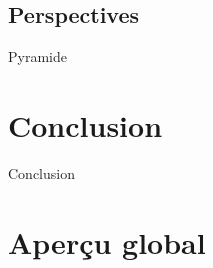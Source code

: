 \documentclass{bredelebeamer}
\begin{document}
\subsection{Perspectives}


\begin{frame}{Pyramide}
\end{frame}




\section{Conclusion}


\begin{frame}{Conclusion}
\end{frame}




\section{Aperçu global}
\end{document}
